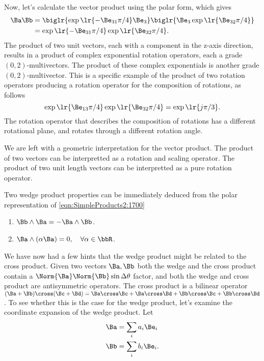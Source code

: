{Now, let's calculate the vector product using the polar form, which gives
\begin{equation}\label{eqn:products:1960}
\begin{aligned}
\Ba \Bb 
&= \biglr{ \exp\lr{ -\Be_{31} \pi/4 } \Be_3 } \biglr{ \Be_3 \exp\lr{ \Be_{32} \pi/4 } } \\
&= \exp\lr{ -\Be_{31} \pi/4 } \exp\lr{ \Be_{32} \pi/4 }.
\end{aligned}
\end{equation}
The product of two unit vectors, each with a component in the z-axis direction, results in a product of complex exponential rotation operators, each a
grade \((0,2)\)-multivectors.  The product of these complex exponentials is another grade \((0,2)\)-multivector.  This is a specific example of the product of two rotation operators producing a
rotation operator for the composition of rotations, as follows
\begin{equation}\label{eqn:products:1980}
\exp\lr{ \Be_{13} \pi/4 }
\exp\lr{ \Be_{32} \pi/4 } = \exp\lr{ j \pi/3 }.
\end{equation}
The rotation operator that describes the composition of rotations has a different rotational plane, and rotates through a different rotation angle.

We are left with a geometric interpretation for the vector product.  The product of two vectors can be interpretted as a rotation and scaling operator.
The product of two unit length vectors can be interpretted as a pure rotation operator.
} %

Two wedge product properties can be immediately deduced from the polar representation of \cref{eqn:SimpleProducts2:1700}

\begin{enumerate}
\item \( \Bb \wedge \Ba = - \Ba \wedge \Bb \).
\item \( \Ba \wedge (\alpha \Ba) = 0, \quad \forall \alpha \in \bbR \).
\end{enumerate}

We have now had a few hints that the wedge product might be related to the cross product.  Given two vectors \( \Ba, \Bb \) both the wedge and the cross product contain a \( \Norm{\Ba} \Norm{\Bb} \sin \Delta \theta \) factor, and both the wedge and cross product are antisymmetric operators.
The cross product is a bilinear operator \( (\Ba + \Bb) \cross (\Bc + \Bd) =
\Ba \cross \Bc + \Ba \cross \Bd +
\Bb \cross \Bc + \Bb \cross \Bd \).  To see whether this is the case for the wedge product, let's examine the coordinate expansion of the wedge product.  Let
\begin{equation}\label{eqn:products:1160}
\begin{aligned}
\Ba &= \sum_i a_i \Be_i \\
\Bb &= \sum_i b_i \Be_i.
\end{aligned}
\end{equation}


